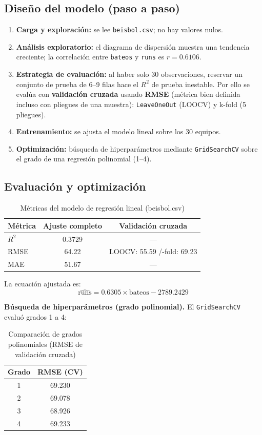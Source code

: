 \documentclass[12pt,a4paper]{article}
\begin{document}
\subsection{Diseño del modelo (paso a paso)}
\begin{enumerate}[itemsep=2pt]
\item \textbf{Carga y exploración:} se lee \texttt{beisbol.csv}; no hay valores nulos.
\item \textbf{Análisis exploratorio:} el diagrama de dispersión muestra una tendencia
      creciente; la correlación entre \texttt{bateos} y \texttt{runs} es
      $r = 0.6106$.
\item \textbf{Estrategia de evaluación:} al haber solo 30 observaciones, reservar un
      conjunto de prueba de 6--9 filas hace el $R^2$ de prueba inestable. Por ello se
      evalúa con \textbf{validación cruzada} usando \textbf{RMSE} (métrica bien
      definida incluso con pliegues de una muestra): \texttt{LeaveOneOut} (LOOCV) y
      k-fold (5 pliegues).
\item \textbf{Entrenamiento:} se ajusta el modelo lineal sobre los 30 equipos.
\item \textbf{Optimización:} búsqueda de hiperparámetros mediante
      \texttt{GridSearchCV} sobre el grado de una regresión polinomial (1--4).
\end{enumerate}

\subsection{Evaluación y optimización}
\begin{table}[H]
\centering
\caption{Métricas del modelo de regresión lineal (beisbol.csv)}
\begin{tabular}{lcc}
\toprule
\textbf{Métrica} & \textbf{Ajuste completo} & \textbf{Validación cruzada} \\
\midrule
$R^2$ & 0.3729 & --- \\
RMSE & 64.22 & LOOCV: 55.59 \;/\; 5-fold: 69.23 \\
MAE & 51.67 & --- \\
\bottomrule
\end{tabular}
\end{table}

La ecuación ajustada es:
\[
\widehat{\text{runs}} = 0.6305 \times \text{bateos} - 2789.2429
\]

\textbf{Búsqueda de hiperparámetros (grado polinomial).} El \texttt{GridSearchCV}
evaluó grados 1 a 4:
\begin{table}[H]
\centering
\caption{Comparación de grados polinomiales (RMSE de validación cruzada)}
\begin{tabular}{cc}
\toprule
\textbf{Grado} & \textbf{RMSE (CV)} \\
\midrule
1 & 69.230 \\
2 & 69.078 \\
3 & 68.926 \\
4 & 69.233 \\
\bottomrule
\end{tabular}
\end{table}
\end{document}

